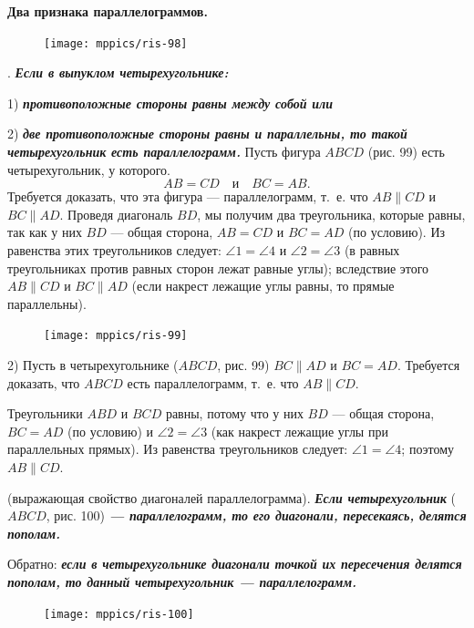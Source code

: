 \documentclass[oneside]{book}
\begin{document}
\textbf{Два признака параллелограммов.}

\begin{figure}
\centering
\texttt{[image: mppics/ris-98]}
\caption{}
\end{figure}

.
\textbf{\emph{Если в выпуклом четырехугольнике:}}

1) \textbf{\emph{противоположные стороны равны между собой или}}

2) \textbf{\emph{две противоположные стороны равны и параллельны, то такой четырехугольник есть параллелограмм.}}
Пусть фигура $ABCD$ (рис. 99) есть четырехугольник, у которого.
\[AB=CD\quad \text{и}\quad BC=AB.\]
Требуется доказать, что эта фигура — параллелограмм, т.~е. что $AB\parallel CD$ и $BC \parallel AD$.
Проведя диагональ $BD$, мы получим два треугольника, которые равны, так как у них $BD$ — общая сторона, $AB=CD$ и $BC = AD$ (по условию).
Из равенства этих треугольников следует:
$\angle 1 = \angle 4 $ и $\angle 2 = \angle 3$ (в равных треугольниках против равных сторон лежат равные углы);
вследствие этого $AB \parallel CD$ и $BC\parallel AD$ (если накрест лежащие углы равны, то прямые параллельны).

\begin{figure}
\centering
\texttt{[image: mppics/ris-99]}
\caption{}
\end{figure}

2) Пусть в четырехугольнике ($ABCD$, рис. 99) $BC\parallel AD$ и $BC = AD$.
Требуется доказать, что $ABCD$ есть параллелограмм, т.~е. что $AB \parallel CD$.

Треугольники $ABD$ и $BCD$ равны, потому что у них $BD$ — общая сторона, $BC = AD$ (по условию) и $\angle 2 = \angle 3$ (как накрест лежащие углы при параллельных прямых).
Из равенства треугольников следует:
$\angle 1 = \angle 4$;
поэтому $AB\parallel CD$.

 (выражающая свойство диагоналей параллелограмма).
\textbf{\emph{Если четырехугольник}} ($ABCD$, рис. 100) \textbf{\emph{— параллелограмм, то его диагонали, пересекаясь, делятся пополам.}}

Обратно:
\textbf{\emph{если в четырехугольнике диагонали точкой их пересечения делятся пополам, то данный четырехугольник — параллелограмм.}}

\begin{figure}
\centering
\texttt{[image: mppics/ris-100]}
\caption{}
\end{figure}
\end{document}
